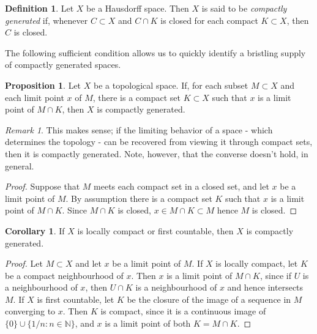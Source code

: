 \documentclass{book}
\theoremstyle{definition}
\newtheorem{proposition}{Proposition}[section]
\newtheorem{corollary}{Corollary}[theorem]
\newtheorem{definition}{Definition}[section]
\theoremstyle{remark}
\newtheorem{remark}{Remark}[section]
\newcommand{\N}{\mathbb{N}}
\begin{document}
\begin{definition}
Let $X$ be a Hausdorff space. Then $X$ is said to be \textit{compactly generated} if, whenever $C\subset X$ and $C\cap K$ is closed for each compact $K\subset X$, then $C$ is closed.
\end{definition}

The following sufficient condition allows us to quickly identify a bristling supply of compactly generated spaces.

\begin{proposition}
Let $X$ be a topological space. If, for each subset $M\subset X$ and each limit point $x$ of $M$, there is a compact set $K\subset X$ such that $x$ is a limit point of $M\cap K$, then $X$ is compactly generated.
\end{proposition}
\begin{remark}
This makes sense; if the limiting behavior of a space - which determines the topology - can be recovered from viewing it through compact sets, then it is compactly generated. Note, however, that the converse doesn't hold, in general.
\end{remark}
\begin{proof}
Suppose that $M$ meets each compact set in a closed set, and let $x$ be a limit point of $M$. By assumption there is a compact set $K$ such that $x$ is a limit point of $M\cap K$. Since $M\cap K$ is closed, $x\in M\cap K\subset M$ hence $M$ is closed.
\end{proof}

\begin{corollary}
If $X$ is locally compact or first countable, then $X$ is compactly generated.
\end{corollary}
\begin{proof}
Let $M\subset X$ and let $x$ be a limit point of $M$. If $X$ is locally compact, let $K$ be a compact neighbourhood of $x$. Then $x$ is a limit point of $M\cap K$, since if $U$ is a neighbourhood of $x$, then $U\cap K$ is a neighbourhood of $x$ and hence intersects $M$. If $X$ is first countable, let $K$ be the closure of the image of a sequence in $M$ converging to $x$. Then $K$ is compact, since it is a continuous image of $\{0\}\cup\{1/n:n\in\N\}$, and $x$ is a limit point of both $K=M\cap K$.
\end{proof}
\end{document}
